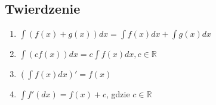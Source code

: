 \documentclass[11pt]{article}
\begin{document}
\subsection{Twierdzenie}
\label{sec:orgd5e66c2}
\begin{enumerate}
\item \(\displaystyle\int \left( f(x) + g(x) \right) dx = \int f(x)dx + \int g(x)dx\)
\item \(\displaystyle\int (c f(x))dx = c \int f(x) dx, c \in \mathbb{R}\)
\item \(\displaystyle \left( \int f(x) dx \right)' = f(x)\)
\item \(\displaystyle \int f'(dx) = f(x) +c\), gdzie \(c \in \mathbb{R}\)
\end{enumerate}
\end{document}
